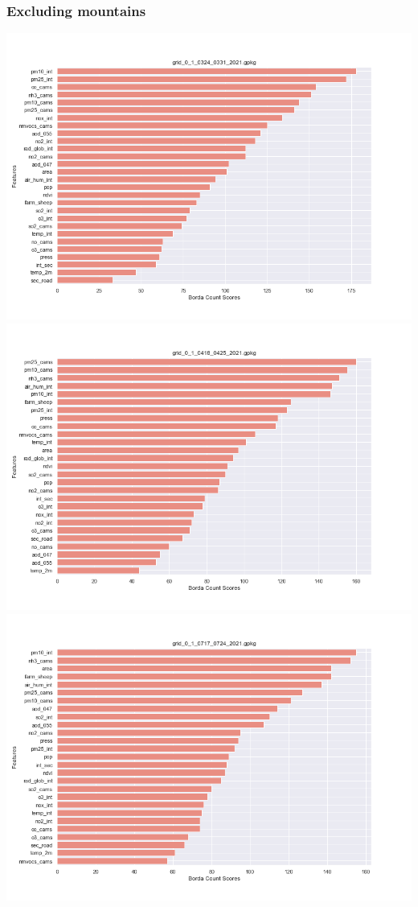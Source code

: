 \subsubsection{Excluding mountains}
\begin{center}
\includegraphics[width=.9\textwidth]{images/fs_results/nh3/01/no_montains/grid_0_1_0324_0331_2021.png}
\includegraphics[width=.9\textwidth]{images/fs_results/nh3/01/no_montains/grid_0_1_0418_0425_2021.png}
\includegraphics[width=.9\textwidth]{images/fs_results/nh3/01/no_montains/grid_0_1_0717_0724_2021.png}

\end{center}
